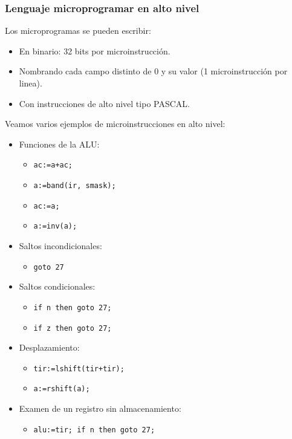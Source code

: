 \subsubsection*{Lenguaje microprogramar en alto nivel}
Los microprogramas se pueden escribir:
\begin{itemize}
    \item En binario: 32 bits por microinstrucción.
    \item Nombrando cada campo distinto de 0 y su valor (1 microinstrucción por linea).
    \item Con instrucciones de alto nivel tipo PASCAL.
\end{itemize}
\begin{ejemplo}
    Veamos varios ejemplos de microinstrucciones en alto nivel:
    \begin{center}
\begin{minipage}{0.45\textwidth}
    \begin{itemize}
        \item Funciones de la ALU:
        \begin{itemize}
            \item \texttt{ac:=a+ac;}
            \item \texttt{a:=band(ir, smask);}
            \item \texttt{ac:=a;}
            \item \texttt{a:=inv(a);}
        \end{itemize}
        \item Saltos incondicionales:
            \begin{itemize}
                \item \texttt{goto 27}
            \end{itemize}
    \end{itemize}

\end{minipage}
\begin{minipage}{0.45\textwidth}
    \begin{itemize}
        \item Saltos condicionales:
        \begin{itemize}
            \item \texttt{if n then goto 27;}
            \item \texttt{if z then goto 27;}
        \end{itemize}
        \item Desplazamiento:
            \begin{itemize}
                \item \texttt{tir:=lshift(tir+tir);}
                \item \texttt{a:=rshift(a);}
            \end{itemize}
        \item Examen de un registro sin almacenamiento:
            \begin{itemize}
                \item \texttt{alu:=tir; if n then goto 27;}
            \end{itemize}
    \end{itemize}
\end{minipage}
\end{center}
\end{ejemplo}
